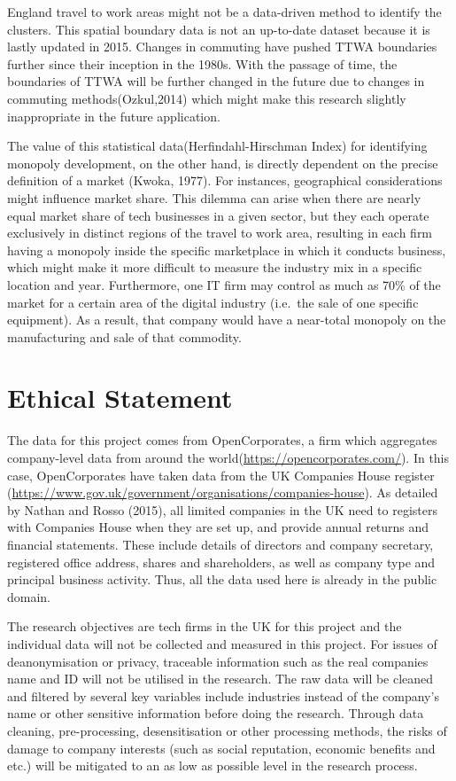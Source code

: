 \documentclass[
  12pt,
  oneside]{book}
\begin{document}
England travel to work areas might not be a data-driven method to identify the clusters. This spatial boundary data is not an up-to-date dataset because it is lastly updated in 2015. Changes in commuting have pushed TTWA boundaries further since their inception in the 1980s. With the passage of time, the boundaries of TTWA will be further changed in the future due to changes in commuting methods(Ozkul,2014) which might make this research slightly inappropriate in the future application.

The value of this statistical data(Herfindahl-Hirschman Index) for identifying monopoly development, on the other hand, is directly dependent on the precise definition of a market (Kwoka, 1977). For instances, geographical considerations might influence market share. This dilemma can arise when there are nearly equal market share of tech businesses in a given sector, but they each operate exclusively in distinct regions of the travel to work area, resulting in each firm having a monopoly inside the specific marketplace in which it conducts business, which might make it more difficult to measure the industry mix in a specific location and year. Furthermore, one IT firm may control as much as 70\% of the market for a certain area of the digital industry (i.e.~the sale of one specific equipment). As a result, that company would have a near-total monopoly on the manufacturing and sale of that commodity.

\hypertarget{ethical-statement}{%
\section{Ethical Statement}\label{ethical-statement}}

The data for this project comes from OpenCorporates, a firm which aggregates company-level data from around the world(\url{https://opencorporates.com/}). In this case, OpenCorporates have taken data from the UK Companies House register (\url{https://www.gov.uk/government/organisations/companies-house}). As detailed by Nathan and Rosso (2015), all limited companies in the UK need to registers with Companies House when they are set up, and provide annual returns and financial statements. These include details of directors and company secretary, registered office address, shares and shareholders, as well as company type and principal business activity. Thus, all the data used here is already in the public domain.

The research objectives are tech firms in the UK for this project and the individual data will not be collected and measured in this project. For issues of deanonymisation or privacy, traceable information such as the real companies name and ID will not be utilised in the research. The raw data will be cleaned and filtered by several key variables include industries instead of the company's name or other sensitive information before doing the research. Through data cleaning, pre-processing, desensitisation or other processing methods, the risks of damage to company interests (such as social reputation, economic benefits and etc.) will be mitigated to an as low as possible level in the research process.
\end{document}
